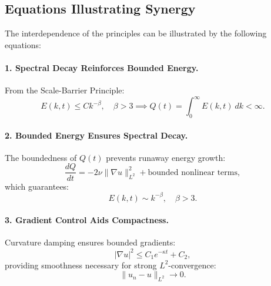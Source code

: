 \subsection{Equations Illustrating Synergy}
The interdependence of the principles can be illustrated by the following equations:

\paragraph{1. Spectral Decay Reinforces Bounded Energy.}
From the Scale-Barrier Principle:
\begin{equation}
E(k, t) \leq Ck^{-\beta}, \quad \beta > 3 \implies Q(t) = \int_0^\infty E(k, t) \ dk < \infty.
\end{equation}

\paragraph{2. Bounded Energy Ensures Spectral Decay.}
The boundedness of $Q(t)$ prevents runaway energy growth:
\begin{equation}
\frac{dQ}{dt} = -2\nu \|\nabla u\|_{L^2}^2 + \text{bounded nonlinear terms},
\end{equation}
which guarantees:
\begin{equation}
E(k, t) \sim k^{-\beta}, \quad \beta > 3.
\end{equation}

\paragraph{3. Gradient Control Aids Compactness.}
Curvature damping ensures bounded gradients:
\begin{equation}
|\nabla u|^2 \leq C_1 e^{-\kappa t} + C_2,
\end{equation}
providing smoothness necessary for strong $L^2$-convergence:
\begin{equation}
\|u_n - u\|_{L^2} \to 0.
\end{equation}

